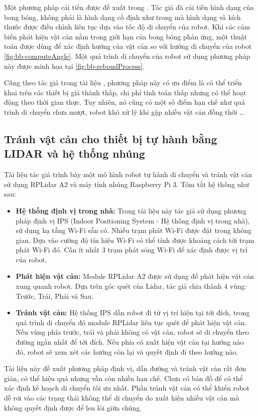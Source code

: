 Một phương pháp cải tiến được đề xuất trong \cite{Susnea2010}. Tác giả đã cải tiến hình dạng của bong bóng, không phải là hình dạng cố định như trong \cite{Quinlan1993} mà hình dạng và kích thước được điều chỉnh liên tục dựa vào tốc độ di chuyển của robot. Khi các cảm biến phát hiện vật cản nằm trong giới hạn của bong bóng phản ứng, một thuật toán được dùng để xác định hướng của vật cản so với hướng di chuyển của robot \figurename{ \ref{fig:bb-computeAngle}}. Một quá trình di chuyển của robot sử dụng phương pháp này được minh họa tại \figurename{ \ref{fig:bb-reboudProcess}}.

Cũng theo tác giả trong tài liệu \cite{Susnea2010}, phương pháp này có ưu điểm là có thể triển khai trên các thiết bị giá thành thấp, chi phí tính toán thấp nhưng có thể hoạt động theo thời gian thực. Tuy nhiên, nó cũng có một số điểm hạn chế như quá trình di chuyển chưa mượt, robot khó xử lý khi gặp nhiều vật cản đồng thời \dots

\subsection{Tránh vật cản cho thiết bị tự hành bằng LIDAR và hệ thống nhúng}
  Tài liệu \cite{Baras2019} tác giả trình bày một mô hình robot tự hành di chuyển và tránh vật cản sử dụng RPLidar A2 và máy tính nhúng Raspberry Pi 3. Tóm tắt hệ thống như sau:
  \begin{itemize}
    \item \textbf{Hệ thống định vị trong nhà:} Trong tài liệu này tác giả sử dụng phương pháp định vị IPS (Indoor Positioning System - Hệ thống định vị trong nhà), sử dụng hạ tầng Wi-Fi sẵn có. Nhiều trạm phát Wi-Fi được đặt trong không gian. Dựa vào cường độ tín hiệu Wi-Fi có thể tính được khoảng cách tới trạm phát Wi-Fi đó. Cần ít nhất 3 trạm phát sóng Wi-Fi để xác định được vị trí của robot.
    \item \textbf{Phát hiện vật cản:} Module RPLidar A2 được sử dụng để phát hiện vật cản xung quanh robot. Dựa trên góc quét của Lidar, tác giả chia thành 4 vùng: Trước, Trái, Phải và Sau.
    \item \textbf{Tránh vật cản:} Hệ thống IPS dẫn robot đi từ vị trí hiện tại tới đích, trong quá trình di chuyển đó module RPLidar liên tục quét để phát hiện vật cản. Nếu vùng phía trước, trái và phải không có vật cản, robot sẽ di chuyển theo đường ngắn nhất để tới đích. Nếu phía có xuất hiện vật cản tại hướng nào đó, robot sẽ xem xét các hướng còn lại và quyết định đi theo hướng nào.
  \end{itemize}
  Tài liệu này đề xuất phương pháp định vị, dẫn đường và tránh vật cản rất đơn giản, có thể hiệu quả nhưng vẫn còn nhiều hạn chế. Chưa có bản đồ để có thể xác định kế hoạch di chuyển tối ưu nhất. Phần tránh vật cản có thể khiển robot dễ rơi vào các trạng thái không thể di chuyển do xuất hiện nhiều vật cản mà không quyết định được để len lỏi giữa chúng.

